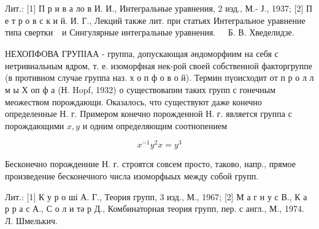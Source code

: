 \documentclass[10pt]{article}
\begin{document}
Лит.: [1] П р и в а ло в И. И., Интегральные уравнения, 2 изд., М.- Ј., 1937; [2] П е т р о в с к и й. И. Г., Лекций также лит. при статьях Интегральное уравнение типа свертки $\begin{array}{ll}\text { и Сингулярные интегральные уравнения. } & \text { Б. В. Хведелидзе. }\end{array}$



НЕХОПФОВА ГРУПІАА - группа, допускающая әндоморфиим на себя с нетривиальным ядром, т. е. изоморфная нек-рой своей собственной факторгруппе (в противном случае группа наз. х о п ф о в о й). Термин пүоисходит от п р о л л м ы Х оп ф а (Н. Hopf, 1932) о существовапии таких групп с гонечным меожеством порождающи. Оказалось, что существуют даже конечно определенные Н. г. Примером конечно порожденной Н. г. является группа с порождающими $x, y$ и одним определяющим соотнопением



\[

x^{-1} y^{2} x=y^{3}

\]



Бесконечно порожденние Н. г. строятся совсем просто, таково, напр., прямое произведение бесконечного числа изоморфыых между собой групп.



Лит.: [1] К у р о ші А. Г., Теория групп, 3 изд., М., 1967; [2] М а г н у с В., К а р р а с А., С о л и тә р Д., Комбинаторная теория групп, пер. с англ., М., 1974. Л. Шмелькич.
\end{document}

